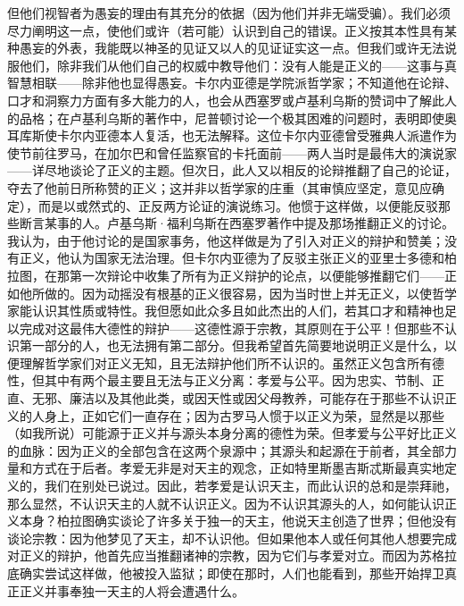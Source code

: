 但他们视智者为愚妄的理由有其充分的依据（因为他们并非无端受骗）。我们必须尽力阐明这一点，使他们或许（若可能）认识到自己的错误。正义按其本性具有某种愚妄的外表，我能既以神圣的见证又以人的见证证实这一点。但我们或许无法说服他们，除非我们从他们自己的权威中教导他们：没有人能是正义的——这事与真智慧相联——除非他也显得愚妄。卡尔内亚德是学院派哲学家；不知道他在论辩、口才和洞察力方面有多大能力的人，也会从西塞罗或卢基利乌斯的赞词中了解此人的品格；在卢基利乌斯的著作中，尼普顿讨论一个极其困难的问题时，表明即使奥耳库斯使卡尔内亚德本人复活，也无法解释。这位卡尔内亚德曾受雅典人派遣作为使节前往罗马，在加尔巴和曾任监察官的卡托面前——两人当时是最伟大的演说家——详尽地谈论了正义的主题。但次日，此人又以相反的论辩推翻了自己的论证，夺去了他前日所称赞的正义；这并非以哲学家的庄重（其审慎应坚定，意见应确定），而是以或然式的、正反两方论证的演说练习。他惯于这样做，以便能反驳那些断言某事的人。卢基乌斯·福利乌斯在西塞罗著作中提及那场推翻正义的讨论。我认为，由于他讨论的是国家事务，他这样做是为了引入对正义的辩护和赞美；没有正义，他认为国家无法治理。但卡尔内亚德为了反驳主张正义的亚里士多德和柏拉图，在那第一次辩论中收集了所有为正义辩护的论点，以便能够推翻它们——正如他所做的。因为动摇没有根基的正义很容易，因为当时世上并无正义，以使哲学家能认识其性质或特性。我但愿如此众多且如此杰出的人们，若其口才和精神也足以完成对这最伟大德性的辩护——这德性源于宗教，其原则在于公平！但那些不认识第一部分的人，也无法拥有第二部分。但我希望首先简要地说明正义是什么，以便理解哲学家们对正义无知，且无法辩护他们所不认识的。虽然正义包含所有德性，但其中有两个最主要且无法与正义分离：孝爱与公平。因为忠实、节制、正直、无邪、廉洁以及其他此类，或因天性或因父母教养，可能存在于那些不认识正义的人身上，正如它们一直存在；因为古罗马人惯于以正义为荣，显然是以那些（如我所说）可能源于正义并与源头本身分离的德性为荣。但孝爱与公平好比正义的血脉：因为正义的全部包含在这两个泉源中；其源头和起源在于前者，其全部力量和方式在于后者。孝爱无非是对天主的观念，正如特里斯墨吉斯忒斯最真实地定义的，我们在别处已说过。因此，若孝爱是认识天主，而此认识的总和是崇拜祂，那么显然，不认识天主的人就不认识正义。因为不认识其源头的人，如何能认识正义本身？柏拉图确实谈论了许多关于独一的天主，他说天主创造了世界；但他没有谈论宗教：因为他梦见了天主，却不认识他。但如果他本人或任何其他人想要完成对正义的辩护，他首先应当推翻诸神的宗教，因为它们与孝爱对立。而因为苏格拉底确实尝试这样做，他被投入监狱；即使在那时，人们也能看到，那些开始捍卫真正正义并事奉独一天主的人将会遭遇什么。\par

